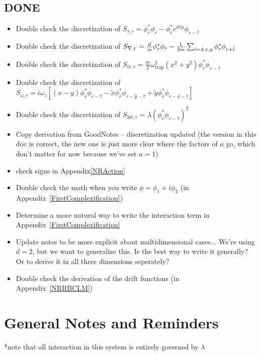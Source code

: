 \documentclass[../RotatingBosons.tex]{subfiles}
\begin{document}
\subsection{DONE}
\begin{itemize}
	\item Double check the discretization of $S_{\tau, r}  =  \phi^{*}_{r}\phi_{r}- \phi^{*}_{r}e^{d \tau \mu} \phi_{r - \hat{\tau}} $
	\item Double check the discretization of $S_{{\nabla}, r}  =  \frac{d}{m} \phi^{*}_{r}\phi_{r} - \frac{1}{2m}\sum_{i = \pm x,y} \phi^{*}_{r}\phi_{r+\hat{i}}$
	\item Double check the discretization of $S_{\mathrm{tr},r} = \frac{m}{2}\omega_{\text{trap}}^{2}(x^{2}+y^{2})\phi_{r}^{*}\phi_{r-\hat{\tau}}$
	\item Double check the discretization of $S_{\omega, r} =  i \omega_{z} \left[ (x-y)\phi_{r}^{*}  \phi_{r-\hat{\tau}} - \widetilde{x} \phi_{r}^{*} \phi_{r-\hat{y}-\hat{\tau}} + \widetilde{y} \phi_{r}^{*}  \phi_{r-\hat{x}-\hat{\tau}} \right] $
	\item Double check the discretization of $S_{\text{int}, r} = \lambda \left(\phi_{r}^{*} \phi_{r-\hat{\tau}}\right)^{2}$	
	\item Copy derivation from GoodNotes -- discretization updated (the version in this doc is correct, the new one is just more clear where the factors of $a$ go, which don't matter for now because we've set $a = 1$)
	\item check signs in Appendix\ref{NRAction}
	\item Double check the math when you write $\phi = \phi_{1} + i\phi_{2}$ (in Appendix~\ref{FirstComplexification})
	\item Determine a more natural way to write the interaction term in Appendix~\ref{FirstComplexification}
	\item Update notes to be more explicit about multidimensional cases... We're using $d=2$, but we want to generalize this. Is the best way to write it generally? Or to derive it in all three dimensions seperately?
	\item Double check the derivation of the drift functions (in Appendix~\ref{NRRBCLM}) 
\end{itemize}

\section{General Notes and Reminders}
*note that all interaction in this system is entirely governed by $\lambda$
\end{document}

